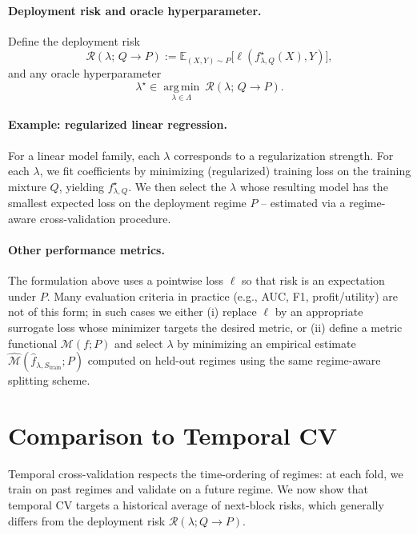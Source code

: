 \documentclass[11pt]{article}
\newcommand{\E}{\mathbb{E}}
\newcommand{\cR}{\mathcal{R}}
\newcommand{\argmin}{\operatorname*{arg\,min}}
\begin{document}
\paragraph{Deployment risk and oracle hyperparameter.}
Define the deployment risk
\[
\cR(\lambda;\,Q\to P)
:= \E_{(X,Y)\sim P}\big[\ell(f^\star_{\lambda,Q}(X),Y)\big],
\tag{D1}
\]
and any oracle hyperparameter
\[
\lambda^\star \in \argmin_{\lambda\in\Lambda}\ \cR(\lambda;\,Q\to P).
\tag{D2}
\]





\paragraph{Example: regularized linear regression.}
For a linear model family, each $\lambda$ corresponds to a regularization strength.
For each $\lambda$, we fit coefficients by minimizing (regularized) training loss on the
training mixture $Q$, yielding $f^\star_{\lambda,Q}$. We then select the $\lambda$ whose
resulting model has the smallest expected loss on the deployment regime $P$ -- estimated
via a regime-aware cross-validation procedure.

\paragraph{Other performance metrics.}
The formulation above uses a pointwise loss $\ell$ so that risk is an expectation under $P$.
Many evaluation criteria in practice (e.g., AUC, F1, profit/utility) are not of this form; in such cases we
either (i) replace $\ell$ by an appropriate surrogate loss whose minimizer targets the desired metric, or (ii) define a metric functional $\mathcal{M}(f;P)$ and select $\lambda$ by minimizing an empirical estimate
$\widehat{\mathcal{M}}(\hat f_{\lambda,S_{\mathrm{train}}};P)$ computed on held-out regimes using the same
regime-aware splitting scheme.



\section{Comparison to Temporal CV}

Temporal cross-validation respects the time-ordering of regimes: at each fold, we train on
past regimes and validate on a future regime. We now show that temporal CV targets a
historical average of next-block risks, which generally differs from the deployment risk
$\cR(\lambda; Q \to P)$.
\end{document}
